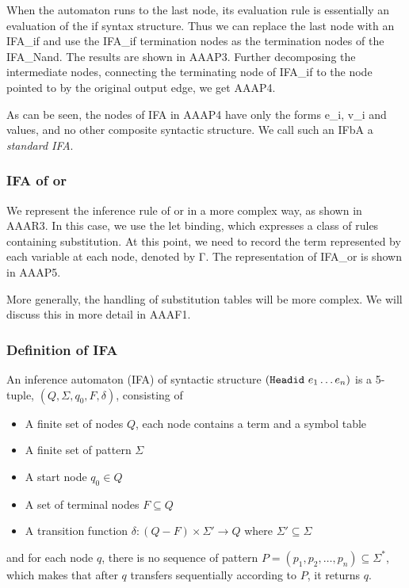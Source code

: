 When the automaton runs to the last node, its evaluation rule is essentially an evaluation of the if syntax structure. Thus we can replace the last node with an IFA\_if and use the IFA\_if termination nodes as the termination nodes of the IFA\_Nand. The results are shown in AAAP3. Further decomposing the intermediate nodes, connecting the terminating node of IFA\_if to the node pointed to by the original output edge, we get AAAP4. 

As can be seen, the nodes of IFA in AAAP4 have only the forms e\_i, v\_i and values, and no other composite syntactic structure.  We call such an IFbA a \textit{standard IFA}.

\subsubsection{IFA of or}

We represent the inference rule of or in a more complex way, as shown in AAAR3. In this case, we use the let binding, which expresses a class of rules containing substitution. At this point, we need to record the term represented by each variable at each node, denoted by Γ. The representation of IFA\_or is shown in AAAP5.

More generally, the handling of substitution tables will be more complex. We will discuss this in more detail in AAAF1.

\subsubsection{Definition of IFA}

\begin{Def}

An inference automaton (IFA) of syntactic structure $(\mbox{\tt Headid}~e_1 \ldots e_n)$ is a 5-tuple, $(Q, \Sigma, q_0, F, \delta)$, consisting of

\begin{itemize}
    \item A finite set of nodes $Q$, each node contains a term and a symbol table
    \item A finite set of pattern $\Sigma$
    \item A start node $q_0 \in Q$
    \item A set of terminal nodes $F \subseteq Q$ 
    \item A transition function $\delta: (Q-F) \times \Sigma' \to Q$ where $\Sigma' \subseteq \Sigma$
\end{itemize}

and for each node $q$, there is no sequence of pattern $P = (p_1,p_2,\ldots,p_n)\subseteq \Sigma^*$, which makes that after $q$ transfers sequentially according to $P$, it returns $q$.

\end{Def}

